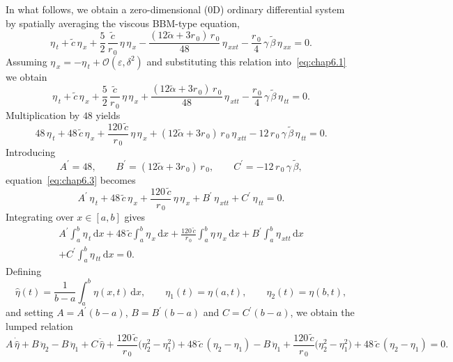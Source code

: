 \documentclass[alpha-refs, 12pt]{wiley-article}
\renewcommand{\O}{\mathcal{O}}
\newcommand{\ud}{\mathrm{d}}
\newcommand{\eps}{\varepsilon}
\begin{document}
In what follows, we obtain a zero-dimensional (0D) ordinary differential system by spatially averaging the viscous BBM-type equation,
\begin{equation}\label{eq:chap6.1}
  \eta_{\,t}
  +\tilde{c}\,\eta_{\,x}
  +\frac{5}{2}\,\frac{\tilde{c}}{r_{\,0}}\,\eta\,\eta_{\,x}
  -\frac{(12\tilde{\alpha}+3r_{\,0})\,r_{\,0}}{48}\,\eta_{\,xxt}
  -\frac{r_{\,0}}{4}\,\gamma\,\tilde{\beta}\,\eta_{\,xx}=0.
\end{equation}
Assuming
\(\eta_{\,x}=-\eta_{\,t} + \O(\eps,\delta^{2})\) and substituting this
relation into~\eqref{eq:chap6.1} we obtain
\begin{equation}\label{eq:chap6.2}
  \eta_{\,t}
  +\tilde{c}\,\eta_{\,x}
  +\frac{5}{2}\,\frac{\tilde{c}}{r_{\,0}}\,\eta\,\eta_{\,x}
  +\frac{(12\tilde{\alpha}+3r_{\,0})\,r_{\,0}}{48}\,\eta_{\,xtt}
  -\frac{r_{\,0}}{4}\,\gamma\,\tilde{\beta}\,\eta_{\,tt}=0.
\end{equation}
Multiplication by \(48\) yields
\begin{equation}\label{eq:chap6.3}
  48\,\eta_{\,t}
  +48\,\tilde{c}\,\eta_{\,x}
  +\frac{120\,\tilde{c}}{r_{\,0}}\,\eta\,\eta_{\,x}
  +(12\tilde{\alpha}+3r_{\,0})\,r_{\,0}\,\eta_{\,xtt}
  -12\,r_{\,0}\,\gamma\,\tilde{\beta}\,\eta_{\,tt}=0.
\end{equation}
Introducing
\[
  A^{\prime}=48,\qquad
  B^{\prime}=(12\tilde{\alpha}+3r_{\,0})\,r_{\,0},\qquad
  C^{\prime}=-12\,r_{\,0}\,\gamma\,\tilde{\beta},
\]
equation~\eqref{eq:chap6.3} becomes
\begin{equation}
  A^{\prime}\,\eta_{\,t}
  +48\,\tilde{c}\,\eta_{\,x}
  +\frac{120\,\tilde{c}}{r_{\,0}}\,\eta\,\eta_{\,x}
  +B^{\prime}\,\eta_{\,xtt}
  +C^{\prime}\,\eta_{\,tt}=0.
\end{equation}
Integrating over \(x\in[a,b]\) gives
\begin{multline}\label{eq:chap6.4}
  A^{\prime}\int_{a}^{b}\eta_{\,t}\,\ud x
  +48\,\tilde{c}\int_{a}^{b}\eta_{\,x}\,\ud x
  +\frac{120\,\tilde{c}}{r_{\,0}}\int_{a}^{b}\eta\,\eta_{\,x}\,\ud x
  +B^{\prime}\int_{a}^{b}\eta_{\,xtt}\,\ud x\\
  +C^{\prime}\int_{a}^{b}\eta_{\,tt}\,\ud x=0.
\end{multline}
Defining
\[
  \hat{\eta}(t)=\frac{1}{b-a}\int_{a}^{b}\eta(x,t)\,\ud x,\qquad
  \eta_{1}(t)=\eta(a,t),\qquad
  \eta_{2}(t)=\eta(b,t),
\]
and setting
\(A=A^{\prime}(b-a)\), \(B=B^{\prime}(b-a)\) and
\(C=C^{\prime}(b-a)\), we obtain the lumped relation
\begin{equation}\label{eq:chap6.5}
  A\,\dot{\hat{\eta}}
  +B\,\ddot{\eta}_{2}
  -B\,\ddot{\eta}_{1}
  +C\,\ddot{\hat{\eta}}
  +\frac{120\,\tilde{c}}{r_{\,0}}\bigl(\eta_{2}^{2}-\eta_{1}^{2}\bigr)
  +48\,\tilde{c}\,(\eta_{2}-\eta_{1})
  -B\,\ddot{\eta}_{1}
  +\frac{120\,\tilde{c}}{r_{\,0}}\bigl(\eta_{2}^{2}-\eta_{1}^{2}\bigr)
  +48\,\tilde{c}\,(\eta_{2}-\eta_{1})=0.
\end{equation}
\end{document}

